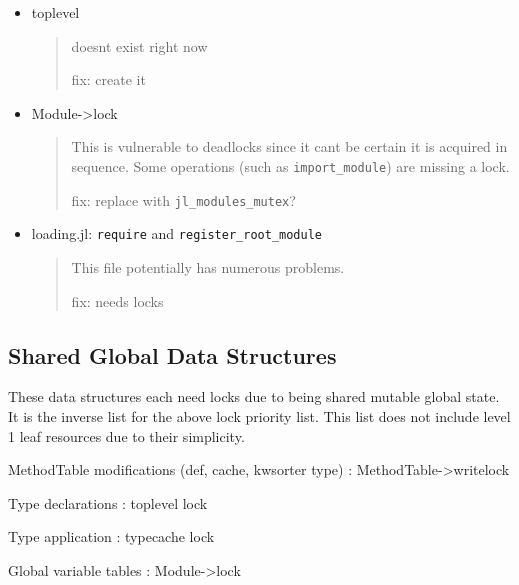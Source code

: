 \begin{itemize}
\item toplevel

\begin{quote}
doesn{\textquotesingle}t exist right now

fix: create it

\end{quote}

\item Module->lock

\begin{quote}
This is vulnerable to deadlocks since it can{\textquotesingle}t be certain it is acquired in sequence. Some operations (such as \texttt{import\_module}) are missing a lock.

fix: replace with \texttt{jl\_modules\_mutex}?

\end{quote}

\item loading.jl: \texttt{require} and \texttt{register\_root\_module}

\begin{quote}
This file potentially has numerous problems.

fix: needs locks

\end{quote}
\end{itemize}


\hypertarget{1067922422509615580}{}


\subsection{Shared Global Data Structures}



These data structures each need locks due to being shared mutable global state. It is the inverse list for the above lock priority list. This list does not include level 1 leaf resources due to their simplicity.



MethodTable modifications (def, cache, kwsorter type) : MethodTable->writelock



Type declarations : toplevel lock



Type application : typecache lock



Global variable tables : Module->lock



